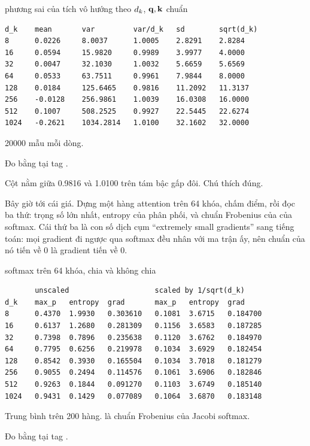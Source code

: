 \begin{measured}{phương sai của tích vô hướng theo \(d_{k}\), \(\mathbf{q}, \mathbf{k}\) chuẩn}
\begin{verbatim}
d_k    mean       var         var/d_k   sd        sqrt(d_k)
8      0.0226     8.0037      1.0005    2.8291    2.8284
16     0.0594     15.9820     0.9989    3.9977    4.0000
32     0.0047     32.1030     1.0032    5.6659    5.6569
64     0.0533     63.7511     0.9961    7.9844    8.0000
128    0.0184     125.6465    0.9816    11.2092   11.3137
256    -0.0128    256.9861    1.0039    16.0308   16.0000
512    0.1007     508.2525    0.9927    22.5445   22.6274
1024   -0.2621    1034.2814   1.0100    32.1602   32.0000
\end{verbatim}

20000 mẫu mỗi dòng.

Đo bằng  tại tag .
\end{measured}

Cột  nằm giữa 0.9816 và 1.0100 trên tám bậc gấp đôi. Chú thích
đúng.

Bây giờ tới cái giá. Dựng một hàng attention trên 64 khóa, chấm điểm, rồi đọc
ba thứ: trọng số lớn nhất, entropy của phân phối, và chuẩn Frobenius của
 của softmax. Cái thứ ba là con số dịch cụm \enquote{extremely small
gradients} sang tiếng toán: mọi gradient đi ngược qua softmax đều nhân với ma
trận ấy, nên chuẩn của nó tiến về 0 là gradient tiến về 0.

\begin{measured}{softmax trên 64 khóa, chia và không chia}
\begin{verbatim}
       unscaled                    scaled by 1/sqrt(d_k)
d_k    max_p   entropy  grad       max_p   entropy  grad
8      0.4370  1.9930   0.303610   0.1081  3.6715   0.184700
16     0.6137  1.2680   0.281309   0.1156  3.6583   0.187285
32     0.7398  0.7896   0.235638   0.1120  3.6762   0.184970
64     0.7795  0.6256   0.219978   0.1034  3.6929   0.182454
128    0.8542  0.3930   0.165504   0.1034  3.7018   0.181279
256    0.9055  0.2494   0.114576   0.1061  3.6906   0.182846
512    0.9263  0.1844   0.091270   0.1103  3.6749   0.185140
1024   0.9431  0.1429   0.077089   0.1064  3.6870   0.183148
\end{verbatim}

Trung bình trên 200 hàng.  là chuẩn Frobenius của Jacobi softmax.

Đo bằng  tại tag .
\end{measured}

